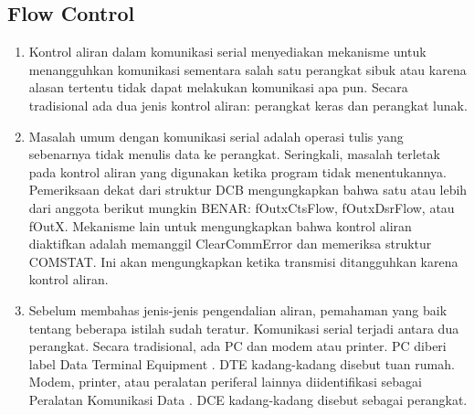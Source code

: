 \subsection{Flow Control}
	\begin{enumerate}
		\item Kontrol aliran dalam komunikasi serial menyediakan mekanisme untuk menangguhkan komunikasi sementara salah satu perangkat sibuk atau karena alasan tertentu tidak dapat melakukan komunikasi apa pun. Secara tradisional ada dua jenis kontrol aliran: perangkat keras dan perangkat lunak.

\item Masalah umum dengan komunikasi serial adalah operasi tulis yang sebenarnya tidak menulis data ke perangkat. Seringkali, masalah terletak pada kontrol aliran yang digunakan ketika program tidak menentukannya. Pemeriksaan dekat dari struktur DCB mengungkapkan bahwa satu atau lebih dari anggota berikut mungkin BENAR: fOutxCtsFlow, fOutxDsrFlow, atau fOutX. Mekanisme lain untuk mengungkapkan bahwa kontrol aliran diaktifkan adalah memanggil ClearCommError dan memeriksa struktur COMSTAT. Ini akan mengungkapkan ketika transmisi ditangguhkan karena kontrol aliran.

\item Sebelum membahas jenis-jenis pengendalian aliran, pemahaman yang baik tentang beberapa istilah sudah teratur. Komunikasi serial terjadi antara dua perangkat. Secara tradisional, ada PC dan modem atau printer. PC diberi label Data Terminal Equipment . DTE kadang-kadang disebut tuan rumah. Modem, printer, atau peralatan periferal lainnya diidentifikasi sebagai Peralatan Komunikasi Data . DCE kadang-kadang disebut sebagai perangkat.
\end{enumerate}

\cite{bai2004windows}
\cite{carvey2005tracking}
\cite{boling2003programming}			
